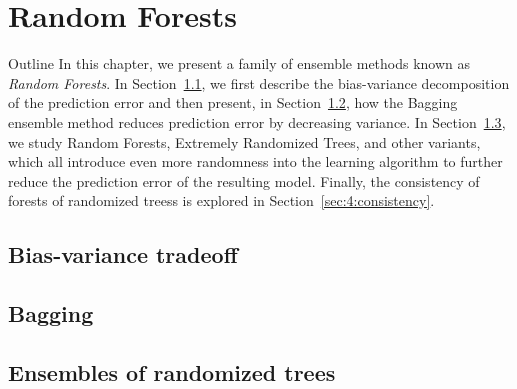 \chapter{Random Forests}\label{ch:forest}

\begin{remark}{Outline}
In this chapter, we present a family of ensemble methods known as \textit{Random
Forests}. In Section~\ref{sec:4:bias-variance}, we first describe the
bias-variance decomposition of the prediction error and then present, in
Section~\ref{sec:4:bagging}, how the Bagging ensemble method reduces
prediction error by decreasing variance. In Section~\ref{sec:4:ensemble},
we study Random Forests, Extremely Randomized Trees, and other variants, which
all introduce even more randomness into the learning algorithm to further
reduce the prediction error of the resulting model. Finally, the consistency of
forests of randomized treess is explored in Section~\ref{sec:4:consistency}.
\end{remark}

\section{Bias-variance tradeoff}
\label{sec:4:bias-variance}


\section{Bagging}
\label{sec:4:bagging}




\section{Ensembles of randomized trees}
\label{sec:4:ensemble}

